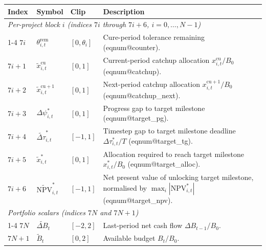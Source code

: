 \documentclass[10pt,border=6pt]{standalone}
\makeatletter
\newcommand{\tabfont}{\fontsize{8.5}{10.5}\selectfont}
\newcommand{\eqn}[1]{(\csname eqnum@#1\endcsname)}
\makeatother
\begin{document}
\begin{minipage}{170mm}   %
\tabfont
\setlength{\tabcolsep}{4pt}
\renewcommand{\arraystretch}{1.15}
\begin{tabularx}{\linewidth}{l l l >{\raggedright\arraybackslash}X}
\toprule
\textbf{Index} & \textbf{Symbol} & \textbf{Clip} & \textbf{Description} \\
\midrule
\multicolumn{4}{l}{\textit{Per-project block $i$ \quad (indices $7i$ through $7i+6$, $i = 0,\ldots,N-1$)}} \\
\cmidrule{1-4}
$7i$   & $\theta^{\mathrm{rem}}_{i,t}$             & $[0,\theta_i]$ & Cure-period tolerance remaining \eqn{counter}. \\
$7i+1$ & $\tilde{x}^{\mathrm{cu}}_{i,t}$           & $[0,1]$        & Current-period catchup allocation $x^{\mathrm{cu}}_{i,t}/B_0$ \eqn{catchup}. \\
$7i+2$ & $\tilde{x}^{\mathrm{cu}+1}_{i,t}$         & $[0,1]$        & Next-period catchup allocation $x^{\mathrm{cu}+1}_{i,t}/B_0$ \eqn{catchup_next}. \\
$7i+3$ & $\Delta\psi^*_{i,t}$                      & $[0,1]$        & Progress gap to target milestone \eqn{target_pg}. \\
$7i+4$ & $\widetilde{\Delta\tau}^*_{i,t}$          & $[-1,1]$       & Timestep gap to target milestone deadline $\Delta\tau^*_{i,t}/T$ \eqn{target_tg}. \\
$7i+5$ & $\tilde{x}^*_{i,t}$                       & $[0,1]$        & Allocation required to reach target milestone $x^*_{i,t}/B_0$ \eqn{target_alloc}. \\
$7i+6$ & $\widetilde{\mathrm{NPV}}^*_{i,t}$        & $[-1,1]$       & Net present value of unlocking target milestone, normalised by $\max_i|\mathrm{NPV}^*_{i,t}|$ \eqn{target_npv}. \\
\midrule
\multicolumn{4}{l}{\textit{Portfolio scalars \quad (indices $7N$ and $7N+1$)}} \\
\cmidrule{1-4}
$7N$   & $\widetilde{\Delta B}_{t}$                & $[-2,2]$       & Last-period net cash flow $\Delta B_{t-1}/B_0$. \\
$7N+1$ & $\tilde{B}_t$                             & $[0,2]$        & Available budget $B_t/B_0$. \\
\bottomrule
\end{tabularx}
\end{minipage}
\end{document}
